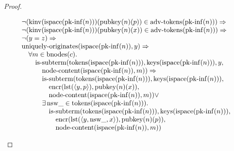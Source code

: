\documentclass[11pt]{article}
\theoremstyle{plain}
\begin{document}
\begin{proof}
\begin{itemize}[leftmargin=2.8em, itemsep=4pt, parsep=1pt]
\begin{itemize}[leftmargin=2.8em, itemsep=4pt, parsep=1pt]
\begin{equation*}
\begin{array}{@{}l@{}}
\begin{array}{@{}l@{}} \neg (\operatorname{kinv}(\operatorname{ispace}(\operatorname{pk\text{-}inf}(n)))(\operatorname{pubkey}(n)(p)) \in \operatorname{adv\text{-}tokens}(\operatorname{pk\text{-}inf}(n))) \Rightarrow  \\ \neg (\operatorname{kinv}(\operatorname{ispace}(\operatorname{pk\text{-}inf}(n)))(\operatorname{pubkey}(n)(x)) \in \operatorname{adv\text{-}tokens}(\operatorname{pk\text{-}inf}(n))) \Rightarrow  \\ \neg (y = z) \Rightarrow  \\ \operatorname{uniquely\text{-}originates}(\operatorname{ispace}(\operatorname{pk\text{-}inf}(n)), y) \Rightarrow  \\ \quad \forall m \in \operatorname{bnodes}(c). \\ \quad \quad \operatorname{is\text{-}subterm}(\operatorname{tokens}(\operatorname{ispace}(\operatorname{pk\text{-}inf}(n))), \operatorname{keys}(\operatorname{ispace}(\operatorname{pk\text{-}inf}(n))), y, \\ \quad \quad \quad \operatorname{node\text{-}content}(\operatorname{ispace}(\operatorname{pk\text{-}inf}(n)), m)) \Rightarrow \\ \quad \quad \quad \operatorname{is\text{-}subterm}(\operatorname{tokens}(\operatorname{ispace}(\operatorname{pk\text{-}inf}(n))), \operatorname{keys}(\operatorname{ispace}(\operatorname{pk\text{-}inf}(n))), \\ \quad \quad \quad \quad \operatorname{encr}(\operatorname{lst}(\langle y, p \rangle), \operatorname{pubkey}(n)(x)), \\ \quad \quad \quad \quad \operatorname{node\text{-}content}(\operatorname{ispace}(\operatorname{pk\text{-}inf}(n)), m)) \vee \\ \quad \quad \quad \exists \operatorname{nsw\_} \in \operatorname{tokens}(\operatorname{ispace}(\operatorname{pk\text{-}inf}(n))). \\ \quad \quad \quad \quad \operatorname{is\text{-}subterm}(\operatorname{tokens}(\operatorname{ispace}(\operatorname{pk\text{-}inf}(n))), \operatorname{keys}(\operatorname{ispace}(\operatorname{pk\text{-}inf}(n))), \\ \quad \quad \quad \quad \quad \operatorname{encr}(\operatorname{lst}(\langle y, \operatorname{nsw\_}, x \rangle), \operatorname{pubkey}(n)(p)), \\ \quad \quad \quad \quad \quad \operatorname{node\text{-}content}(\operatorname{ispace}(\operatorname{pk\text{-}inf}(n)), m)) \end{array} \\

\end{array}
\end{equation*}
\end{itemize}
\end{itemize}
\end{proof}
\end{document}

